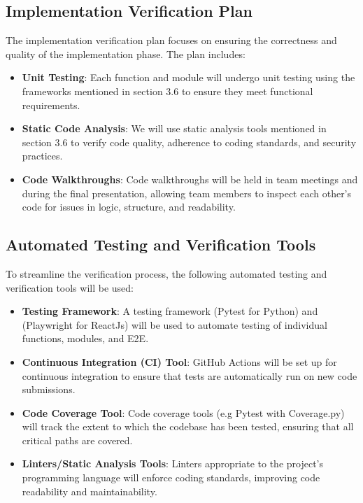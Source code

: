 \documentclass[12pt, titlepage]{article}
\begin{document}
\subsection{Implementation Verification Plan}

The implementation verification plan focuses on ensuring the correctness and quality of the implementation phase. The plan includes:

\begin{itemize}
    \item \textbf{Unit Testing}: Each function and module will undergo unit testing using the frameworks mentioned in section 3.6 to ensure they meet functional requirements.
    \item \textbf{Static Code Analysis}: We will use static analysis tools mentioned in section 3.6 to verify code quality, adherence to coding standards, and security practices.
    \item \textbf{Code Walkthroughs}: Code walkthroughs will be held in team meetings and during the final presentation, allowing team members to inspect each other’s code for issues in logic, structure, and readability.
\end{itemize}

\subsection{Automated Testing and Verification Tools}

To streamline the verification process, the following automated testing and verification tools will be used:

\begin{itemize}
  \item \textbf{Testing Framework}: A testing framework (Pytest for Python) and (Playwright for ReactJs) will be used to automate testing of individual functions, modules, and E2E.
  \item \textbf{Continuous Integration (CI) Tool}: GitHub Actions will be set up for continuous integration to ensure that tests are automatically run on new code submissions.
  \item \textbf{Code Coverage Tool}: Code coverage tools (e.g Pytest with Coverage.py) will track the extent to which the codebase has been tested, ensuring that all critical paths are covered.
  \item \textbf{Linters/Static Analysis Tools}: Linters appropriate to the project’s programming language will enforce coding standards, improving code readability and maintainability.
\end{itemize}
\end{document}
